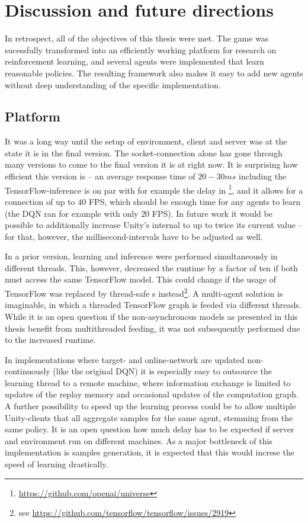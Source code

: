 \chapter{Discussion and future directions}

In retrospect, all of the objectives of this thesis were met. The game was sucessfully transformed into an efficiently working platform for research on reinforcement learning, and several agents were implemented that learn reasonable policies. The resulting framework also makes it easy to add new agents without deep understanding of the specific implementation.

\section{Platform}

It was a long way until the setup of environment, client and server was at the state it is in the final version. The socket-connection alone has gone through many versions to come to the final version it is at right now. It is surprising how efficient this version is -- an average response time of $20-30ms$ including the TensorFlow-inference is on par with for example the delay in \footnote{\url{https://github.com/openai/universe}}, and it allows for a connection of up to $40$ FPS, which should be enough time for any agents to learn (the DQN ran for example with only $20$ FPS). In future work it would be possible to additionally increase Unity's internal  to up to twice its current value -- for that, however, the millisecond-intervals have to be adjusted as well.

In a prior version, learning and inference were performed simultaneously in different threads. This, however, decreased the runtime by a factor of ten if both must access the same TensorFlow model. This could change if the usage of TensorFlow  was  replaced by thread-safe s instead\footnote{see \url{https://github.com/tensorflow/tensorflow/issues/2919}}. A multi-agent solution is imaginable, in which a threaded TensorFlow graph is feeded via different threads. While it is an open question if the non-asynchronous models as presented in this thesis benefit from multithreaded feeding, it was not subsequently performed due to the increased runtime. 

In implementations where target- and online-network are updated non-continuously (like the original DQN) it is especially easy to outsource the learning thread to a remote machine, where information exchange is limited to updates of the replay memory and occasional updates of the computation graph. A further possibility to speed up the learning process could be to allow multiple Unity-clients that all aggregate samples for the same agent, stemming from the same policy. It is an open question how much delay has to be expected if server and environment run on different machines. As a major bottleneck of this implementation is samples generation, it is expected that this would increse the speed of learning drastically.

